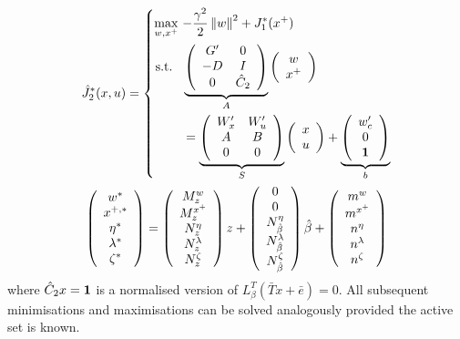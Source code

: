 \documentclass{ifacconf}
\providecommand{\norm}[1]{\left\|#1\right\|}
\begin{document}
\begin{gather*}
	\hat J_2^\ast(x,u) = \left\{\begin{split}
	\max_{w,x^+} \ & {-\frac{\gamma^2}{2}}\norm{w}^2 + J_{1}^\ast(x^+)\\
	\text{s.t. }\ & 
	\underbrace{\left(\begin{array}{cc}
	G^\prime & 0 \\ -D & I \\
	0 & \hat C_2
	\end{array}\right)}_{\bar A}
	\left(\begin{array}{c}w\\ x^+\end{array}\right)
	\\&= \underbrace{\left(\begin{array}{cc}W_x^\prime & W_u^\prime \\ A & B \\ 0 & 0\end{array}\right)}_{
	\bar S
	}
	\left(\begin{array}{c}x \\ u \end{array}\right) + \underbrace{\left(\begin{array}{c}
	w_c^\prime \\ 0 \\ {\bf{1}}\end{array}\right)}_{\bar b}
	\end{split}\right.
\\
	\left(\begin{array}{c}
	w^\ast \\
	x^{+,\ast} \\
	\eta^\ast \\
	\lambda^\ast\\
	\zeta^\ast
	\end{array}\right) = \left(\begin{array}{c}M^w_z\\ M^{x^+}_z \\ N^{\eta}_z \\ N^{\lambda}_z \\ N^{\zeta}_z
	\end{array}\right)z + 
	\left(\begin{array}{c}0\\ 0 \\ N^{\eta}_{\hat\beta} \\ N^{\lambda}_{\hat\beta} \\ N^\zeta_{\hat\beta}
	\end{array}\right)\hat\beta + \left(\begin{array}{c}m^w\\ m^{x^+} \\ n^{\eta} \\ n^{\lambda}\\ n^\zeta
	\end{array}\right)
\end{gather*}
where $\hat C_2 x = {\bf{1}}$ is a normalised version of $L^T_\beta(\bar T x + \bar e) = 0$.
All subsequent minimisations and maximisations can be solved analogously provided the active set is
known.
\end{document}
